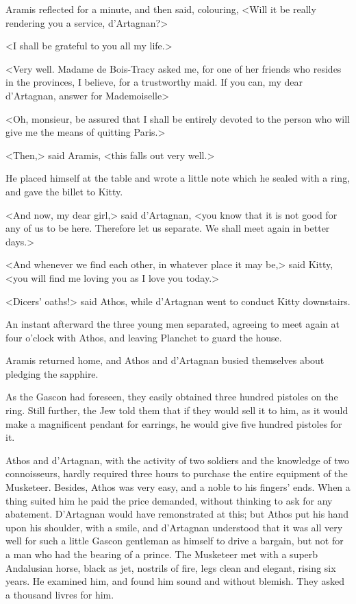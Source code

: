 Aramis reflected for a minute, and then said, colouring, <Will it be really rendering you a service, d'Artagnan?> 

<I shall be grateful to you all my life.> 

<Very well. Madame de Bois-Tracy asked me, for one of her friends who resides in the provinces, I believe, for a trustworthy maid. If you can, my dear d'Artagnan, answer for Mademoiselle\longdash> 

<Oh, monsieur, be assured that I shall be entirely devoted to the person who will give me the means of quitting Paris.> 

<Then,> said Aramis, <this falls out very well.> 

He placed himself at the table and wrote a little note which he sealed with a ring, and gave the billet to Kitty. 

<And now, my dear girl,> said d'Artagnan, <you know that it is not good for any of us to be here. Therefore let us separate. We shall meet again in better days.> 

<And whenever we find each other, in whatever place it may be,> said Kitty, <you will find me loving you as I love you today.> 

<Dicers' oaths!> said Athos, while d'Artagnan went to conduct Kitty downstairs. 

An instant afterward the three young men separated, agreeing to meet again at four o'clock with Athos, and leaving Planchet to guard the house. 

Aramis returned home, and Athos and d'Artagnan busied themselves about pledging the sapphire. 

As the Gascon had foreseen, they easily obtained three hundred pistoles on the ring. Still further, the Jew told them that if they would sell it to him, as it would make a magnificent pendant for earrings, he would give five hundred pistoles for it. 

Athos and d'Artagnan, with the activity of two soldiers and the knowledge of two connoisseurs, hardly required three hours to purchase the entire equipment of the Musketeer. Besides, Athos was very easy, and a noble to his fingers' ends. When a thing suited him he paid the price demanded, without thinking to ask for any abatement. D'Artagnan would have remonstrated at this; but Athos put his hand upon his shoulder, with a smile, and d'Artagnan understood that it was all very well for such a little Gascon gentleman as himself to drive a bargain, but not for a man who had the bearing of a prince. The Musketeer met with a superb Andalusian horse, black as jet, nostrils of fire, legs clean and elegant, rising six years. He examined him, and found him sound and without blemish. They asked a thousand livres for him. 

